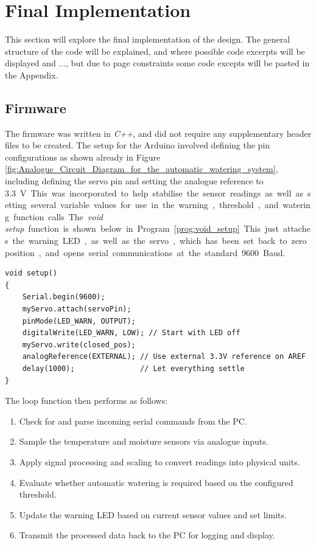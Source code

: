 \documentclass[a4paper,11pt]{article}
\begin{document}
\section{Final Implementation}
\label{sec:final_implementation}

This section will explore the final implementation of the design.
The general structure of the code will be explained, 
and where possible code excerpts will be displayed and ...,
but due to page constraints some code excepts will be pasted in the Appendix.

\subsection{Firmware}
\label{sec:firmware}

The firmware was written in \textit{C++}, and did not require any supplementary 
header files to be created.
The setup for the Arduino involved defining the pin configurations
as shown already in 
Figure \ref{fig:Analogue_Circuit_Diagram_for_the_automatic_watering_system},
including defining the servo pin and setting the analogue reference to \SI{3.3} \volt.
This was incorporated to help stabilise the sensor readings.
as well as setting several variable values for use in the 
warning, threshold, and watering function calls.

The \textit{void setup} function is shown below in 
Program \ref{prog:void_setup}. 
This just attaches the warning LED,
as well as the servo, which has been set back to zero position,
and opens serial communications at the standard 9600 Baud.

\begin{lstlisting}[style=cpp-style, 
    caption={\textit{void setup} function}, label={prog:void_setup}]
void setup()
{
    Serial.begin(9600);
    myServo.attach(servoPin);
    pinMode(LED_WARN, OUTPUT);
    digitalWrite(LED_WARN, LOW); // Start with LED off
    myServo.write(closed_pos);
    analogReference(EXTERNAL); // Use external 3.3V reference on AREF
    delay(1000);               // Let everything settle
}
\end{lstlisting}

The loop function then performs as follows: 

\begin{enumerate}[label=\Roman*., nosep]
    \item Check for and parse incoming serial commands from the PC.
    \item Sample the temperature and moisture sensors via analogue inputs.
    \item Apply signal processing and scaling to convert 
    readings into physical units.
    \item Evaluate whether automatic watering is required based on the configured threshold.
    \item Update the warning LED based on current sensor values and set limits.
    \item Transmit the processed data back to the PC for logging and display.
\end{enumerate}
\end{document}

